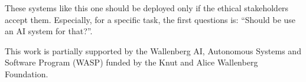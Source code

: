 \documentclass[12pt]{article}
\begin{document}
    These systems like this one should be deployed only if the ethical stakeholders accept them.
    Especially, for a specific task, the first questions is: ``Should be use an AI system for that?''.


    \begin{ack}
        This work is partially supported by the Wallenberg AI, Autonomous Systems and Software Program (WASP) funded by the Knut and Alice Wallenberg Foundation.
    \end{ack}

    

    
\end{document}
